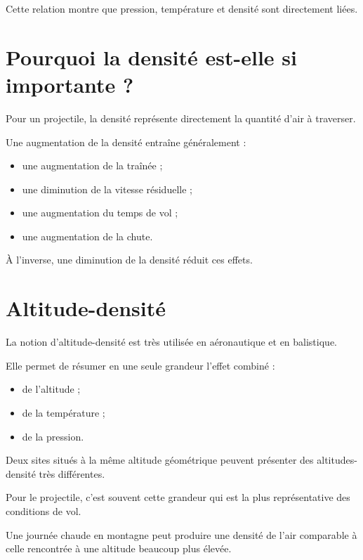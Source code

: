 Cette relation montre que pression, température et densité sont
directement liées.

\section{Pourquoi la densité est-elle si importante ?}

Pour un projectile, la densité représente directement la quantité d'air à
traverser.

Une augmentation de la densité entraîne généralement :

\begin{itemize}
\item une augmentation de la traînée ;
\item une diminution de la vitesse résiduelle ;
\item une augmentation du temps de vol ;
\item une augmentation de la chute.
\end{itemize}

À l'inverse, une diminution de la densité réduit ces effets.

\section{Altitude-densité}

La notion d'altitude-densité est très utilisée en aéronautique et en
balistique.

Elle permet de résumer en une seule grandeur l'effet combiné :

\begin{itemize}
\item de l'altitude ;
\item de la température ;
\item de la pression.
\end{itemize}

Deux sites situés à la même altitude géométrique peuvent présenter des
altitudes-densité très différentes.

Pour le projectile, c'est souvent cette grandeur qui est la plus
représentative des conditions de vol.

\begin{exemple}

Une journée chaude en montagne peut produire une densité de l'air
comparable à celle rencontrée à une altitude beaucoup plus élevée.

\end{exemple}

